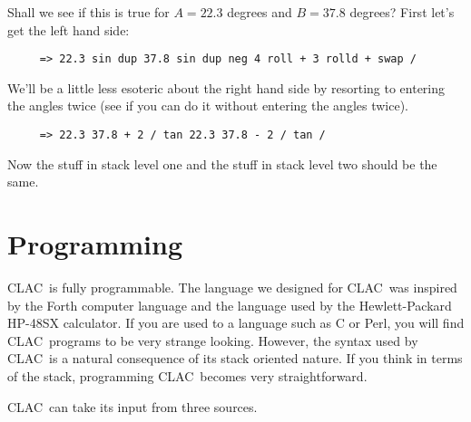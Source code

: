 \documentclass{report}
\newcommand{\CLAC}{CLAC}
\begin{document}
Shall we see if this is true for $A = 22.3$ degrees and $B = 37.8$ degrees? First let's get the left hand side:

\begin{verbatim}
     => 22.3 sin dup 37.8 sin dup neg 4 roll + 3 rolld + swap /
\end{verbatim}

We'll be a little less esoteric about the right hand side by resorting to entering the angles twice (see if you can do it without entering the angles twice).

\begin{verbatim}
     => 22.3 37.8 + 2 / tan 22.3 37.8 - 2 / tan /
\end{verbatim}

Now the stuff in stack level one and the stuff in stack level two should be the same.

\chapter{Programming}

\CLAC\ is fully programmable. The language we designed for \CLAC\ was inspired by the Forth computer language and the language used by the Hewlett-Packard HP-48SX calculator. If you are used to a language such as C or Perl, you will find \CLAC\ programs to be very strange looking. However, the syntax used by \CLAC\ is a natural consequence of its stack oriented nature. If you think in terms of the stack, programming \CLAC\ becomes very straightforward.

\CLAC\ can take its input from three sources.
\end{document}
